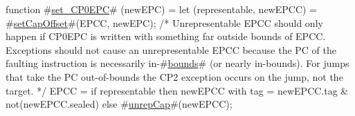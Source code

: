function #\hyperref[zsetzyCP0EPC]{set\_CP0EPC}# (newEPC) = {
  let (representable, newEPCC) = #\hyperref[zsetCapOffset]{setCapOffset}#(EPCC, newEPC);
  /* Unrepresentable EPCC should only happen if CP0EPC is
    written with something far outside bounds of EPCC. Exceptions should
    not cause an unrepresentable EPCC because the PC of the faulting
    instruction is necessarily in-#\hyperref[zbounds]{bounds}# (or nearly in-bounds). For jumps
    that take the PC out-of-bounds the CP2 exception occurs on the jump,
    not the target. */
  EPCC = if representable then
      {newEPCC with tag = newEPCC.tag & not(newEPCC.sealed)}
    else
      #\hyperref[zunrepCap]{unrepCap}#(newEPCC);
}
